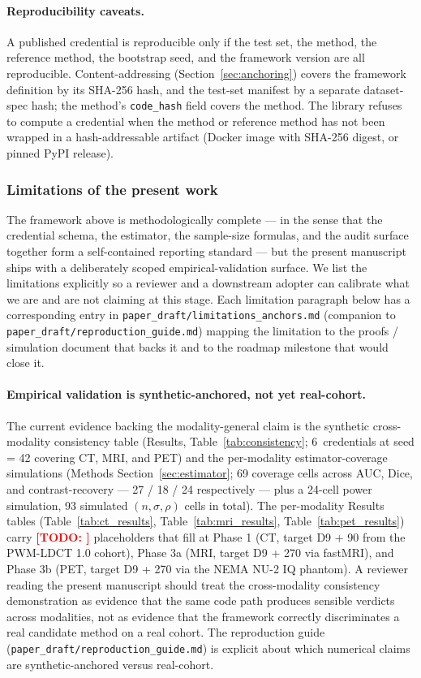 \documentclass[twoside,11pt]{article}
\newcommand{\todo}[1]{\textcolor{red}{\textbf{[TODO: #1]}}}
\begin{document}
\paragraph{Reproducibility caveats.} A published credential is reproducible only if the test set, the method, the reference method, the bootstrap seed, and the framework version are all reproducible. Content-addressing (Section~\ref{sec:anchoring}) covers the framework definition by its SHA-256 hash, and the test-set manifest by a separate dataset-spec hash; the method's \texttt{code\_hash} field covers the method. The library refuses to compute a credential when the method or reference method has not been wrapped in a hash-addressable artifact (Docker image with SHA-256 digest, or pinned PyPI release).

\subsubsection*{Limitations of the present work}
\label{sec:limitations}

The framework above is methodologically complete --- in the sense that the credential schema, the estimator, the sample-size formulas, and the audit surface together form a self-contained reporting standard --- but the present manuscript ships with a deliberately scoped empirical-validation surface. We list the limitations explicitly so a reviewer and a downstream adopter can calibrate what we are and are not claiming at this stage. Each limitation paragraph below has a corresponding entry in \texttt{paper\_draft/limitations\_anchors.md} (companion to \texttt{paper\_draft/reproduction\_guide.md}) mapping the limitation to the proofs / simulation document that backs it and to the roadmap milestone that would close it.

\paragraph{Empirical validation is synthetic-anchored, not yet real-cohort.} The current evidence backing the modality-general claim is the synthetic cross-modality consistency table (Results, Table~\ref{tab:consistency}; 6~credentials at seed = 42 covering CT, MRI, and PET) and the per-modality estimator-coverage simulations (Methods Section~\ref{sec:estimator}; 69 coverage cells across AUC, Dice, and contrast-recovery --- 27 / 18 / 24 respectively --- plus a 24-cell power simulation, 93 simulated $(n, \sigma, \rho)$ cells in total). The per-modality Results tables (Table~\ref{tab:ct_results}, Table~\ref{tab:mri_results}, Table~\ref{tab:pet_results}) carry \todo{} placeholders that fill at Phase 1 (CT, target D9 + 90 from the PWM-LDCT 1.0 cohort), Phase 3a (MRI, target D9 + 270 via fastMRI), and Phase 3b (PET, target D9 + 270 via the NEMA NU-2 IQ phantom). A reviewer reading the present manuscript should treat the cross-modality consistency demonstration as evidence that the same code path produces sensible verdicts across modalities, not as evidence that the framework correctly discriminates a real candidate method on a real cohort. The reproduction guide (\texttt{paper\_draft/reproduction\_guide.md}) is explicit about which numerical claims are synthetic-anchored versus real-cohort.
\end{document}
